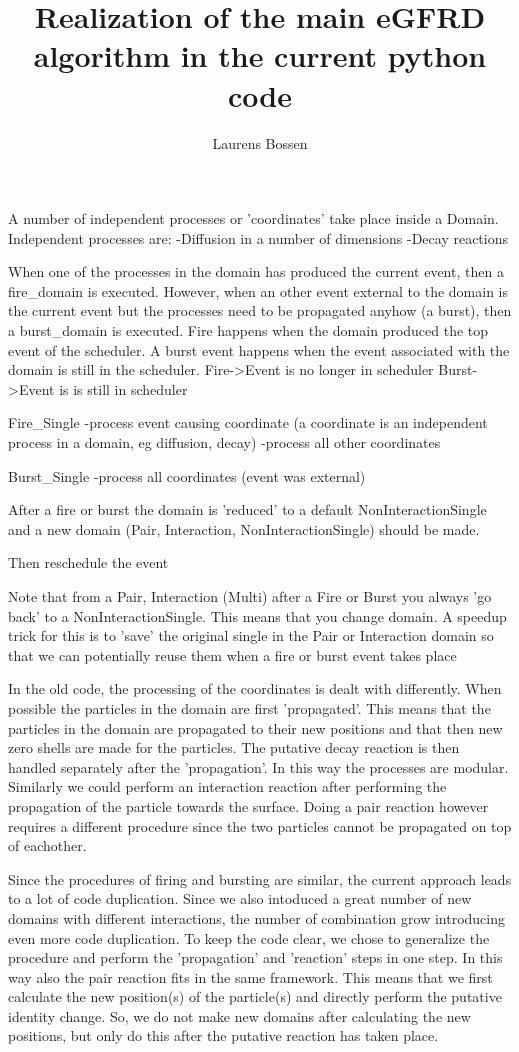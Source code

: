 \documentclass[a4paper, 11pt]{article}
\title{Realization of the main eGFRD algorithm in the current python code}
\author{Laurens Bossen}
\begin{document}
\maketitle

A number of independent processes or 'coordinates' take place inside a Domain. Independent processes are:
-Diffusion in a number of dimensions
-Decay reactions

When one of the processes in the domain has produced the current event, then a fire\_domain is executed. However, when an other
event external to the domain is the current event but the processes need to be propagated anyhow (a burst), then a burst\_domain
is executed.
Fire happens when the domain produced the top event of the scheduler. A burst event happens when the event associated with the
domain is still in the scheduler.
Fire->Event is no longer in scheduler
Burst->Event is is still in scheduler


Fire\_Single
-process event causing coordinate (a coordinate is an independent process in a domain, eg diffusion, decay)
-process all other coordinates

Burst\_Single
-process all coordinates (event was external)

After a fire or burst the domain is 'reduced' to a default NonInteractionSingle and a new domain (Pair, Interaction,
NonInteractionSingle) should be made.

Then reschedule the event


Note that from a Pair, Interaction (Multi) after a Fire or Burst you always 'go back' to a NonInteractionSingle. This means
that you change domain.
A speedup trick for this is to 'save' the original single in the Pair or Interaction domain so that we can potentially reuse
them when a fire or burst event takes place

In the old code, the processing of the coordinates is dealt with differently. When possible the particles in the domain are
first 'propagated'. This means that the particles in the domain are propagated to their new positions and that then new
zero shells are made for the particles. The putative decay reaction is then handled separately after the 'propagation'. In this
way the processes are modular. Similarly we could perform an interaction reaction after performing the propagation of the particle
towards the surface.
Doing a pair reaction however requires a different procedure since the two particles cannot be propagated on top of eachother.

Since the procedures of firing and bursting are similar, the current approach leads to a lot of code duplication. Since we also
intoduced a great number of new domains with different interactions, the number of combination grow introducing even more code
duplication.
To keep the code clear, we chose to generalize the procedure and perform the 'propagation' and 'reaction' steps in one step. In
this way also the pair reaction fits in the same framework.
This means that we first calculate the new position(s) of the particle(s) and directly perform the putative identity change. So,
we do not make new domains after calculating the new positions, but only do this after the putative reaction has taken place.
\end{document}
